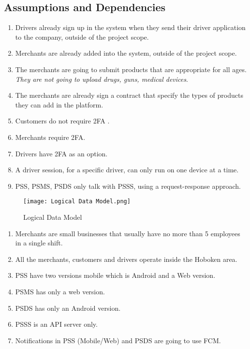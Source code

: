 \subsection{Assumptions and Dependencies}
\begin{enumerate}[label=AS-\arabic*]
    \item Drivers already sign up in the system when they send their 
    driver application to the company, outside of the project scope.
    \item Merchants are already added into the system, outside of the 
    project scope.
    \item The merchants are going to submit products that are appropriate for 
    all ages. \textit{They are not going to upload drugs, guns, 
    medical devices}.
    \item The merchants are already sign a contract that specify the types of 
    products they can add in the platform.
    \item Customers do not require 2FA \cite{2fa}.
    \item Merchants require 2FA.
    \item Drivers have 2FA as an option.
    \item A driver session, for a specific driver, can only run on one 
    device at a time.
    \item PSS, PSMS, PSDS only talk with PSSS, using a 
    request-response approach.
\end{enumerate}
\begin{figure}[!htb]
    \centering
    \texttt{[image: Logical Data Model.png]}
    \caption{Logical Data Model}
\end{figure}

\begin{enumerate}[resume, label=AS-\arabic*]
    \item Merchants are small businesses that usually have no more 
    than 5 employees in a single shift.
    \item All the merchants, customers and drivers operate inside the 
    Hoboken area.
    \pagebreak
    \item PSS have two versions mobile which is Android and a Web version.
    \item PSMS has only a web version.
    \item PSDS has only an Android version.
    \item PSSS is an API server only.
    \item Notifications in PSS (Mobile/Web) and PSDS are going to use FCM.
\end{enumerate}

